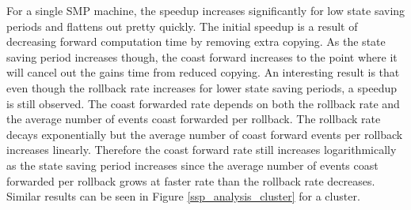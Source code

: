 \documentclass[11pt]{book}
\begin{document}
For a single SMP machine, the speedup increases significantly for low state saving periods and
flattens out pretty quickly.  The initial speedup is a result of decreasing forward computation time
by removing extra copying.  As the state saving period increases though, the coast forward increases
to the point where it will cancel out the gains time from reduced copying.  An interesting result is
that even though the rollback rate increases for lower state saving periods, a speedup is still
observed.  The coast forwarded rate depends on both the rollback rate and the average number of
events coast forwarded per rollback.  The rollback rate decays exponentially but the average number
of coast forward events per rollback increases linearly.  Therefore the coast forward rate still
increases logarithmically as the state saving period increases since the average number of events
coast forwarded per rollback grows at faster rate than the rollback rate decreases.  Similar results
can be seen in Figure \ref{ssp_analysis_cluster} for a cluster.
\end{document}

